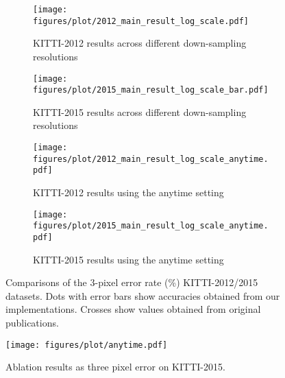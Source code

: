 \documentclass[letterpaper, 10 pt, conference]{ieeeconf}
\begin{document}
\begin{figure}
  \centering
  \vspace{-0.5cm}
  \begin{subfigure}[t]{0.8\linewidth}
   \texttt{[image: figures/plot/2012\_main\_result\_log\_scale.pdf]}
  \caption{KITTI-2012 results across different down-sampling resolutions}
  \label{fig:2012_main_result_log_scale}
  \end{subfigure}\hfill
  \begin{subfigure}[t]{0.8\linewidth}
     \texttt{[image: figures/plot/2015\_main\_result\_log\_scale\_bar.pdf]}
    \caption{KITTI-2015 results across different down-sampling resolutions}
      \label{fig:2015_main_result_log_scale}
  \end{subfigure}
  \begin{subfigure}[t]{0.8\linewidth}

   \texttt{[image: figures/plot/2012\_main\_result\_log\_scale\_anytime.pdf]}

  \caption{KITTI-2012 results using the anytime setting}\label{fig:2012_main_result_log_scale_anytime}

  \end{subfigure}\hfill
  \begin{subfigure}[t]{0.8\linewidth}

   \texttt{[image: figures/plot/2015\_main\_result\_log\_scale\_anytime.pdf]}

  \caption{KITTI-2015 results using the anytime setting}\label{fig:2015_main_result_log_scale_anytime}
  \end{subfigure}
  \caption{Comparisons of the 3-pixel error rate (\%)  KITTI-2012/2015 datasets. Dots with error bars show accuracies obtained from our implementations. Crosses show values obtained from original publications.}
  \label{fig:main_results}
  \vspace{-0.5cm}
\end{figure}




\begin{figure}
  \centering
\vspace{-0.5cm}
 \texttt{[image: figures/plot/anytime.pdf]}

\caption{Ablation results as three pixel error on KITTI-2015. }
\label{fig:ablation}
\vspace{-0.5cm}
\end{figure}
\end{document}

